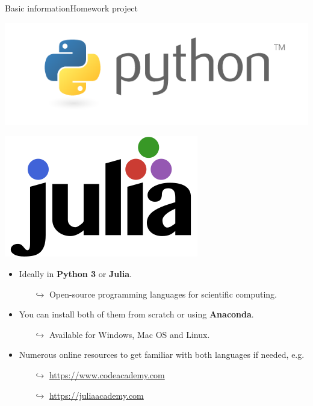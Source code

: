 \documentclass[usenames,dvipsnames,svgnames,10pt,aspectratio=169]{beamer}
\begin{document}
\begin{frame}[t, c]{Basic information}{Homework project}
	\begin{minipage}{.28\textwidth}
		\centering
		\includegraphics[height=.15\textheight]{python_logo}

		\bigskip

		\includegraphics[height=.15\textheight]{julia_logo}
	\end{minipage}%
	\hfill
	\begin{minipage}{.68\textwidth}
		\begin{itemize}
			\item Ideally in \alert{\textbf{Python 3}} or \alert{\textbf{Julia}}.
			\begin{itemize}
				\item[\( \hookrightarrow \)] Open-source programming languages for scientific computing.
			\end{itemize}

			\medskip

			\item You can install both of them from scratch or using \alert{\textbf{Anaconda}}.
			\begin{itemize}
				\item[\( \hookrightarrow \)] Available for Windows, Mac OS and Linux.
			\end{itemize}

			\medskip

			\item Numerous online resources to get familiar with both languages if needed, e.g.
			\begin{itemize}
			\item[\( \hookrightarrow \)] \url{https://www.codeacademy.com}
      \item[\( \hookrightarrow \)] \url{https://juliaacademy.com}
			\end{itemize}
		\end{itemize}
	\end{minipage}

	\vspace{1cm}
\end{frame}
\end{document}

